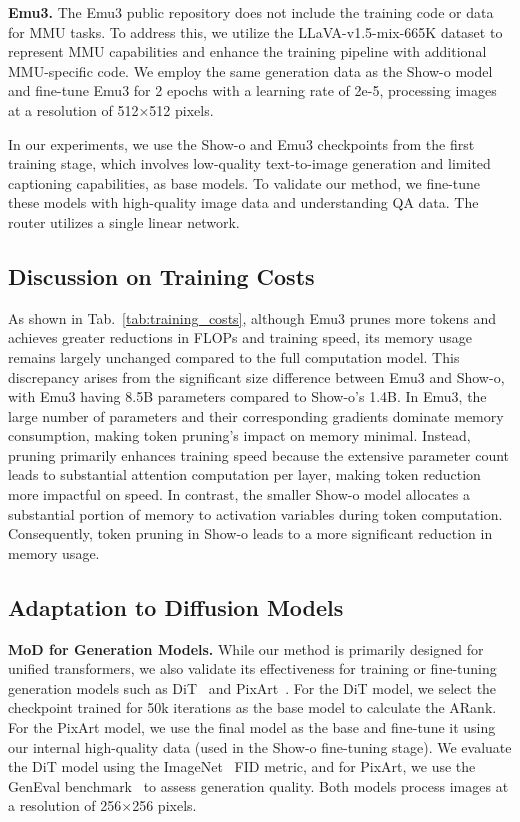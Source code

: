 \textbf{Emu3.} The Emu3 public repository does not include the training code or data for MMU tasks. To address this, we utilize the LLaVA-v1.5-mix-665K dataset to represent MMU capabilities and enhance the training pipeline with additional MMU-specific code. We employ the same generation data as the Show-o model and fine-tune Emu3 for 2 epochs with a learning rate of 2e-5, processing images at a resolution of 512×512 pixels.

In our experiments, we use the Show-o and Emu3 checkpoints from the first training stage, which involves low-quality text-to-image generation and limited captioning capabilities, as base models. To validate our method, we fine-tune these models with high-quality image data and understanding QA data. The router utilizes a single linear network.


\subsection{Discussion on Training Costs}
\label{discussion_costs}

As shown in Tab.~\ref{tab:training_costs}, although Emu3 prunes more tokens and achieves greater reductions in FLOPs and training speed, its memory usage remains largely unchanged compared to the full computation model. This discrepancy arises from the significant size difference between Emu3 and Show-o, with Emu3 having 8.5B parameters compared to Show-o's 1.4B. In Emu3, the large number of parameters and their corresponding gradients dominate memory consumption, making token pruning's impact on memory minimal. Instead, pruning primarily enhances training speed because the extensive parameter count leads to substantial attention computation per layer, making token reduction more impactful on speed. In contrast, the smaller Show-o model allocates a substantial portion of memory to activation variables during token computation. Consequently, token pruning in Show-o leads to a more significant reduction in memory usage. 








\subsection{Adaptation to Diffusion Models} 
\label{adaption_to_diffusion}
\textbf{MoD for Generation Models.} While our method is primarily designed for unified transformers, we also validate its effectiveness for training or fine-tuning generation models such as DiT~\cite{dit} and PixArt~\cite{pixart}. For the DiT model, we select the checkpoint trained for 50k iterations as the base model to calculate the ARank. For the PixArt model, we use the final model as the base and fine-tune it using our internal high-quality data (used in the Show-o fine-tuning stage). We evaluate the DiT model using the ImageNet~\cite{imagenet} FID metric, and for PixArt, we use the GenEval benchmark~\cite{geneval} to assess generation quality. Both models process images at a resolution of 256×256 pixels. 

